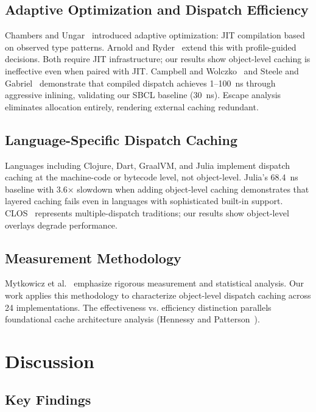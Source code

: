 \documentclass[sigplan,final,acmsmall,review,screen]{acmart}
\begin{document}
\subsection{Adaptive Optimization and Dispatch Efficiency}

Chambers and Ungar~\cite{chambers1989optimizing} introduced adaptive optimization: JIT compilation based on observed type patterns. Arnold and Ryder~\cite{arnold2005feedback} extend this with profile-guided decisions. Both require JIT infrastructure; our results show object-level caching is ineffective even when paired with JIT. Campbell and Wolczko~\cite{campbell1992array} and Steele and Gabriel~\cite{steele1990lisp} demonstrate that compiled dispatch achieves 1--100~ns through aggressive inlining, validating our SBCL baseline (30~ns). Escape analysis~\cite{kotzmann2005escape} eliminates allocation entirely, rendering external caching redundant.

\subsection{Language-Specific Dispatch Caching}

Languages including Clojure, Dart, GraalVM, and Julia implement dispatch caching at the machine-code or bytecode level, not object-level. Julia's 68.4~ns baseline with 3.6× slowdown when adding object-level caching demonstrates that layered caching fails even in languages with sophisticated built-in support. CLOS~\cite{keene1989object} represents multiple-dispatch traditions; our results show object-level overlays degrade performance.

\subsection{Measurement Methodology}

Mytkowicz et al.~\cite{mytkowicz2009producing} emphasize rigorous measurement and statistical analysis. Our work applies this methodology to characterize object-level dispatch caching across 24 implementations. The effectiveness vs. efficiency distinction parallels foundational cache architecture analysis (Hennessy and Patterson~\cite{hennessy2011computer}).

\section{Discussion}
\label{sec:discussion}

\subsection{Key Findings}
\end{document}
